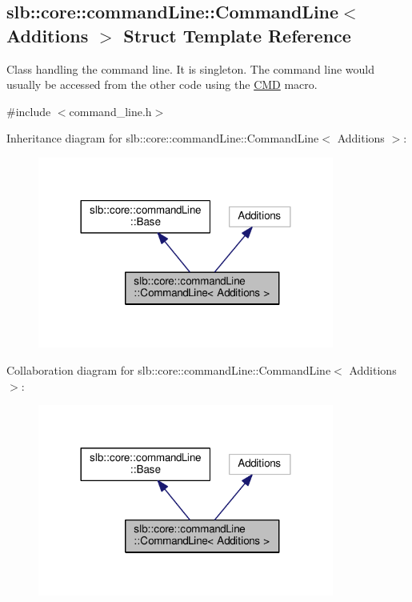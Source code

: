 \hypertarget{structslb_1_1core_1_1commandLine_1_1CommandLine}{}\subsection{slb\+:\+:core\+:\+:command\+Line\+:\+:Command\+Line$<$ Additions $>$ Struct Template Reference}
\label{structslb_1_1core_1_1commandLine_1_1CommandLine}


Class handling the command line. It is singleton. The command line would usually be accessed from the other code using the \hyperlink{command__line_8h_a0a5ceb9ceb914e08d345410b561cb37a}{C\+MD} macro.  




{\ttfamily \#include $<$command\+\_\+line.\+h$>$}



Inheritance diagram for slb\+:\+:core\+:\+:command\+Line\+:\+:Command\+Line$<$ Additions $>$\+:\nopagebreak
\begin{figure}[H]
\begin{center}
\leavevmode
\includegraphics[width=276pt]{structslb_1_1core_1_1commandLine_1_1CommandLine__inherit__graph}
\end{center}
\end{figure}


Collaboration diagram for slb\+:\+:core\+:\+:command\+Line\+:\+:Command\+Line$<$ Additions $>$\+:\nopagebreak
\begin{figure}[H]
\begin{center}
\leavevmode
\includegraphics[width=276pt]{structslb_1_1core_1_1commandLine_1_1CommandLine__coll__graph}
\end{center}
\end{figure}
